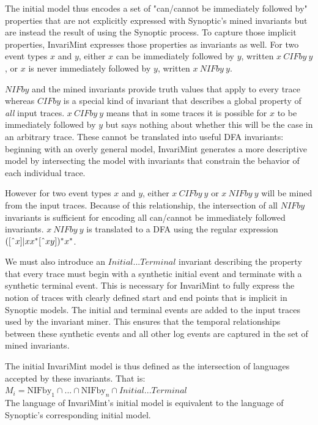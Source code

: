 The initial model thus encodes a set of "can/cannot be immediately
followed by" properties that are not explicitly expressed with Synoptic's 
mined invariants but are instead the result of using the Synoptic process.
To capture those implicit properties, InvariMint expresses those properties as
invariants as well. For two event types $x$ and $y$, either $x$ can be
immediately followed by $y$, written $x~CIFby~y$, or $x$ is never immediately
followed by $y$, written $x~NIFby~y$.

$NIFby$ and the mined invariants
provide truth values that apply to every trace whereas
$CIFby$ is a special kind of invariant that describes a global property of
\emph{all} input traces. $x~CIFby~y$ means that in some traces it is possible
for $x$ to
be immediately followed by $y$ but says nothing about whether this will be the
case in an arbitrary trace.
These cannot be translated into useful DFA invariants: beginning with an
overly general model, InvariMint generates a more descriptive model
by intersecting the model with invariants that
constrain the behavior of each individual trace.

\newcommand\XOR{\mathbin{\char`\^}}
However for two event types $x$ and $y$, either $x~CIFby~y$ or $x~NIFby~y$ will be mined
from the input traces. Because of this relationship, the intersection of
all $NIFby$ invariants is sufficient for encoding all can/cannot be immediately
followed invariants. $x~NIFby~y$ is translated to a DFA using the regular
expression $([\XOR x]|xx^*[\XOR xy])^*x^*$.

We must also introduce an $Initial...Terminal$ invariant describing
the property that every trace must begin with a synthetic initial event and
terminate with a synthetic terminal event. This is necessary for InvariMint to
fully express the notion of traces with
clearly defined start and end points that is implicit in Synoptic models.
The initial and terminal events are
added to the input traces used by the invariant miner. This ensures that the temporal
relationships between these synthetic events and all other log events are
captured in the set of mined invariants. 

The initial InvariMint model is thus defined as the
intersection of languages accepted by these invariants. That is:\\

$M_i = \textrm{NIFby}_1 \cap ... \cap \textrm{NIFby}_n \cap
\textrm{$Initial...Terminal$}$\\

The language of InvariMint's initial model is equivalent to the language of
Synoptic's corresponding initial model.

